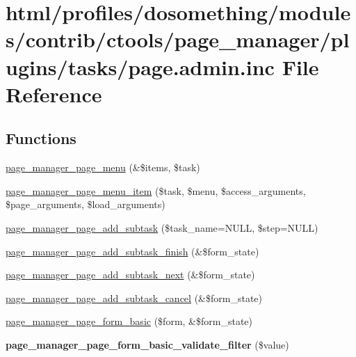 \hypertarget{page_8admin_8inc}{
\section{html/profiles/dosomething/modules/contrib/ctools/page\_\-manager/plugins/tasks/page.admin.inc File Reference}
\label{page_8admin_8inc}
}
\subsection*{Functions}
\begin{DoxyCompactItemize}
\item 
\hyperlink{page_8admin_8inc_a8be2096539f5a1536297131eda4ca631}{page\_\-manager\_\-page\_\-menu} (\&\$items, \$task)
\item 
\hyperlink{page_8admin_8inc_a649d45ee42b5d2c2541a994585495c38}{page\_\-manager\_\-page\_\-menu\_\-item} (\$task, \$menu, \$access\_\-arguments, \$page\_\-arguments, \$load\_\-arguments)
\item 
\hyperlink{page_8admin_8inc_a7c43b68471e1c72718478ca93e1bc25d}{page\_\-manager\_\-page\_\-add\_\-subtask} (\$task\_\-name=NULL, \$step=NULL)
\item 
\hyperlink{page_8admin_8inc_a0c2a86a6b35111414cc9dfd5d7614e27}{page\_\-manager\_\-page\_\-add\_\-subtask\_\-finish} (\&\$form\_\-state)
\item 
\hyperlink{page_8admin_8inc_ad2c4abd104fc2441e26adb971ed53991}{page\_\-manager\_\-page\_\-add\_\-subtask\_\-next} (\&\$form\_\-state)
\item 
\hyperlink{page_8admin_8inc_afc73a5c25508280f01b32bddca4d15a7}{page\_\-manager\_\-page\_\-add\_\-subtask\_\-cancel} (\&\$form\_\-state)
\item 
\hyperlink{page_8admin_8inc_a152056d6f47d7a9d2a28e6f906ff35b1}{page\_\-manager\_\-page\_\-form\_\-basic} (\$form, \&\$form\_\-state)
\item 
\hypertarget{page_8admin_8inc_ae016009bd2dd56187a52e4cce2e065b9}{
{\bfseries page\_\-manager\_\-page\_\-form\_\-basic\_\-validate\_\-filter} (\$value)}
\label{page_8admin_8inc_ae016009bd2dd56187a52e4cce2e065b9}


\end{DoxyCompactItemize}
